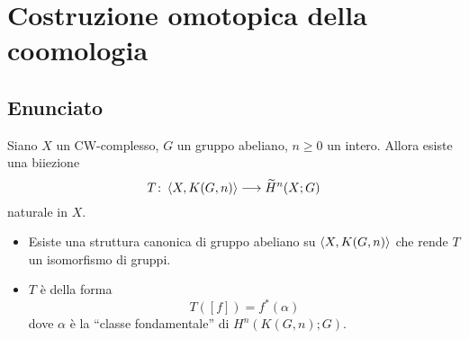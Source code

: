 \documentclass[9pt]{beamer}
\begin{document}
\section*{Costruzione omotopica della coomologia}
\subsection*{Enunciato}
\begin{frame*}
\begin{theorem}
Siano $X$ un CW-complesso, $G$ un gruppo abeliano, $n\ge 0$ un intero. Allora esiste una biiezione
\[
\map{T}{\hmaps{X,K(G,n)}}{\til{H}^n(X;G)}
\]
naturale in $X$.
\end{theorem}
\begin{itemize}
\item Esiste una struttura canonica di gruppo abeliano su $\left\langle X,K(G,n)\right\rangle$ che rende $T$ un isomorfismo di gruppi.
\item $T$ è della forma
\[
T([f])=f^*(\alpha)
\]
dove $\alpha$ è la ``classe fondamentale'' di $H^n(K(G,n);G)$.
\end{itemize}
\end{frame*}


\end{document}
